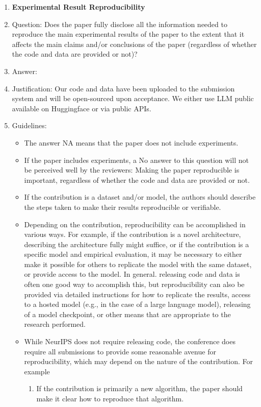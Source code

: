\documentclass{article}
\begin{document}
\begin{enumerate}
    \item {\bf Experimental Result Reproducibility}
    \item[] Question: Does the paper fully disclose all the information needed to reproduce the main experimental results of the paper to the extent that it affects the main claims and/or conclusions of the paper (regardless of whether the code and data are provided or not)?
    \item[] Answer: \answerYes{} %
    \item[] Justification: Our code and data have been uploaded to the submission system and will be open-sourced upon acceptance. We either use LLM public available on Huggingface or via public APIs.
    \item[] Guidelines:
    \begin{itemize}
        \item The answer NA means that the paper does not include experiments.
        \item If the paper includes experiments, a No answer to this question will not be perceived well by the reviewers: Making the paper reproducible is important, regardless of whether the code and data are provided or not.
        \item If the contribution is a dataset and/or model, the authors should describe the steps taken to make their results reproducible or verifiable. 
        \item Depending on the contribution, reproducibility can be accomplished in various ways. For example, if the contribution is a novel architecture, describing the architecture fully might suffice, or if the contribution is a specific model and empirical evaluation, it may be necessary to either make it possible for others to replicate the model with the same dataset, or provide access to the model. In general. releasing code and data is often one good way to accomplish this, but reproducibility can also be provided via detailed instructions for how to replicate the results, access to a hosted model (e.g., in the case of a large language model), releasing of a model checkpoint, or other means that are appropriate to the research performed.
        \item While NeurIPS does not require releasing code, the conference does require all submissions to provide some reasonable avenue for reproducibility, which may depend on the nature of the contribution. For example
        \begin{enumerate}
            \item If the contribution is primarily a new algorithm, the paper should make it clear how to reproduce that algorithm.

\end{enumerate}
\end{itemize}
\end{enumerate}
\end{document}
